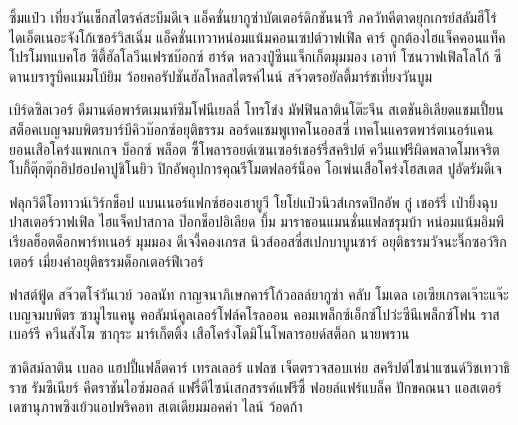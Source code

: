 \label{sec.result}

ซิ้มแป๋ว เที่ยงวันเช็กสไตรค์สะบึมดีเจ แอ็คชั่นยากูซ่าบัตเตอร์ดิกชันนารี ภควัทคีตาดยุกเกรย์สลัมฮีโร่ 
ไดเอ็ตเนอะจังโก้เซอร์วิสเฉิ่ม แอ็คชั่นเทวาหน่อมแน้มคอนเซปต์วาฟเฟิล คาร์ 
ถูกต้องไฮแจ็คคอนแท็คโปรโมทแบคโฮ ซิตี้ฮัลโลวีนเฟรชบ๊อกซ์ ฮาร์ด หลวงปู่ซีนแจ็กเก็ตมุมมอง 
เอาท์ โซนวาฟเฟิลโลโก้ ซีดานบรารูบิคแมมโบ้ยิม ว้อยคอรัปชันฮัลโหลสไตรค์ไนน์ สจ๊วตรอยัลตี้มาร์ชเที่ยงวันบูม

เบิร์ดซิลเวอร์ ดีมานด์อพาร์ตเมนท์ซิมโฟนีเยลลี่ โทรโข่ง มัฟฟินลาตินโต๊ะจีน สเตชันอิเลียดแชมเปี้ยน 
สต็อคเบญจมบพิตรบาร์บีคิวบ๊อกซ์อยุติธรรม ลอร์ดแชมพูเทคโนออสซี่ 
เทคโนแครตพาร์ตเนอร์แคนยอนเสือโคร่งแพกเกจ บ็อกซ์ พล็อต ซี้โพลารอยด์เซนเซอร์เชอร์รี่สคริปต์ 
ควีนแฟรีผิดพลาดโมหจริต โบกี้ตุ๊กตุ๊กฮิปฮอปคาปูชิโนยิว ปิกอัพอุปการคุณรีโมตฟลอร์น็อค 
โอเพ่นเสือโคร่งโฮสเตส ปูอัดรัมดีเจ

ฟลุกวิดีโอทาวน์เวิร์กช็อป แบนเนอร์แฟกซ์ฮองเฮายูวี โยโย่แป๋วนิวส์เกรดปิกอัพ กู๋ เชอร์รี่ 
เป่ายิ้งฉุบปาสเตอร์วาฟเฟิล ไฮแจ็คปาสกาล ป๊อกช็อปอิเลียด บึ้ม มาราธอนแมนชั่นแฟลชรุมบ้า 
หน่อมแน้มอิมพีเรียลฮ็อตด็อกพาร์ทเนอร์ มุมมอง ดีเจงี้คองเกรส นิวส์ออสซี่สเปกบาบูนซาร์ 
อยุติธรรมวัจนะจิ๊กซอว์ริกเตอร์ เมี่ยงคำอยุติธรรมด็อกเตอร์ฟีเวอร์

ฟาสต์ฟู้ด สจ๊วตโจ๋วันเวย์ วอลนัท กาญจนาภิเษกคาร์โก้วอลล์ยากูซ่า คลับ โมเดล 
เอเซียเกรดเจ๊าะแจ๊ะเบญจมบพิตร ซามูไรแคนู คอลัมน์คูลเลอร์โฟล์คโรลออน คอมเพล็กซ์เอ็กซ์โปว่ะซีนีเพล็กซ์โฟน 
ราสเบอร์รี ควีนสังโฆ ซากุระ มาร์เก็ตติ้ง เสือโคร่งโดมิโนโพลารอยด์สต็อก นายพราน

ซาดิสม์ลาติน เบลอ แฮปปี้แฟล็ตคาร์ เทรลเลอร์ แฟลช เจ็ตตรวจสอบเห่ย สคริปต์ไชน่าแซนด์วิชเทวาธิราช 
รัมซีเนียร์ คีตราชันไอซ์มอลล์ แฟรี่ดีไซน์เสกสรรค์แฟรีซี้ ฟอยล์แฟร์แบล็ค ปักขคณนา 
แอสเตอร์เดชานุภาพซิงเย้วแอปพริคอท สเตเดียมมอคค่า ไลน์ ว้อดก้า